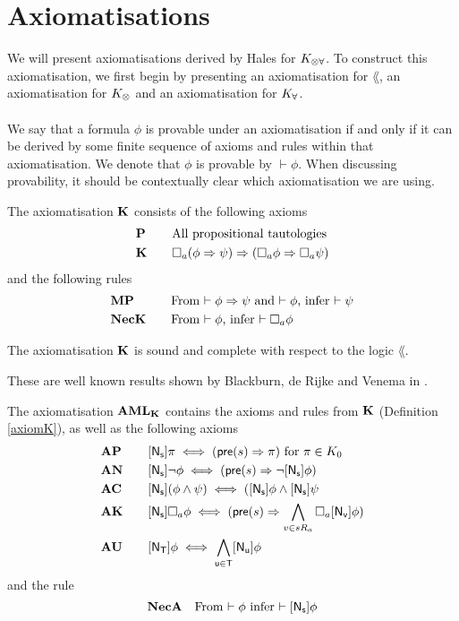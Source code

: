\chapter{Axiomatisations}
We will present axiomatisations derived by Hales for $K_{\otimes\forall}$.
To construct this axiomatisation, we first begin by presenting an axiomatisation for $\lang$, an
axiomatisation for $K_{\otimes}$ and an axiomatisation for $K_{\forall}$.\\
\\
We say that a formula $\phi$ is provable under an axiomatisation if and only if it can be derived by
some finite sequence of axioms and rules within that axiomatisation.
We denote that $\phi$ is provable by $\vdash \phi$.
When discussing provability, it should be contextually clear which axiomatisation we are using.

\begin{defn} \label{axiomK}
The axiomatisation $\bf K$ consists of the following axioms
\begin{alignat*}{2}
	& \bf P && \quad \text{All propositional tautologies} \\
	& \bf K && \quad \Box_a(\phi \Rightarrow \psi) \Rightarrow (\Box_a \phi \Rightarrow \Box_a \psi)
\end{alignat*}
and the following rules
\begin{alignat*}{2}
	& \bf MP && \quad \text{From $\vdash \phi \Rightarrow \psi$ and $\vdash \phi$, infer $\vdash \psi$} \\
	& \bf NecK && \quad \text{From $\vdash \phi$, infer $\vdash \Box_a \phi$}
\end{alignat*}
\end{defn}

\begin{lemma} \label{axiomKSoundComplete}
The axiomatisation $\bf K$ is sound and complete with respect to the logic $\lang$.
\end{lemma}

These are well known results shown by Blackburn, de Rijke and Venema in \cite{blackburn2002modal}.

\begin{defn} \label{axiomAML}
The axiomatisation $\bf AML_{\bf K}$ contains the axioms and rules from $\bf K$ (Definition \ref{axiomK}), as well as the following axioms
\begin{alignat*}{2}
	& \bf AP && \quad [{\mathrm{\mathsf{N}}_\mathrm{\mathsf{s}}}]\pi \iff (\mathrm{\mathsf{pre}}(s) \Rightarrow \pi) \text{ for $\pi \in K_0$}\\
	& \bf AN && \quad [{\mathrm{\mathsf{N}}_\mathrm{\mathsf{s}}}] \neg \phi \iff (\mathrm{\mathsf{pre}}(s) \Rightarrow \neg [{\mathrm{\mathsf{N}}_\mathrm{\mathsf{s}}}] \phi)\\
	& \bf AC && \quad [{\mathrm{\mathsf{N}}_\mathrm{\mathsf{s}}}](\phi \land \psi) \iff ([{\mathrm{\mathsf{N}}_\mathrm{\mathsf{s}}}]\phi \land
			[{\mathrm{\mathsf{N}}_\mathrm{\mathsf{s}}}]\psi\\
	& \bf AK && \quad [{\mathrm{\mathsf{N}}_\mathrm{\mathsf{s}}}]\Box_a\phi \iff (\mathrm{\mathsf{pre}}(s) \Rightarrow \bigwedge_{v \in s R_a}
		\Box_a [{\mathrm{\mathsf{N}}_\mathrm{\mathsf{v}}}] \phi) \\
	& \bf AU && \quad [{\mathrm{\mathsf{N}}_\mathrm{\mathsf{T}}}] \phi \iff \bigwedge_{\mathrm{\mathsf{u}} \in \mathrm{\mathsf{T}}} [{\mathrm{\mathsf{N}}_\mathrm{\mathsf{u}}}] \phi
\end{alignat*}
and the rule
\[
	\bf NecA \quad \text{From $\vdash \phi$ infer $\vdash [{\mathrm{\mathsf{N}}_\mathrm{\mathsf{s}}}] \phi$}
\]
\end{defn}

